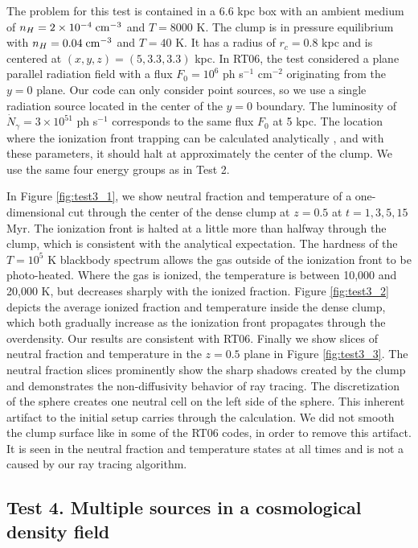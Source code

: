 \documentclass[useAMS,usenatbib]{mn2e}
\begin{document}
The problem for this test is contained in a 6.6 kpc box with an
ambient medium of $n_H = 2 \times 10^{-4}\;\cubecm$ and $T = 8000$ K.
The clump is in pressure equilibrium with $n_H = 0.04\; \cubecm$ and
$T = 40$ K.  It has a radius of $r_c = 0.8$ kpc and is centered at
$(x,y,z) = (5, 3.3, 3.3)$ kpc.  In RT06, the test considered a plane
parallel radiation field with a flux $F_0 = 10^6$ ph s$^{-1}$
cm$^{-2}$ originating from the $y=0$ plane.  Our code can only
consider point sources, so we use a single radiation source located in
the center of the $y=0$ boundary.  The luminosity of $\dot{N}_\gamma =
3 \times 10^{51}$ ph s$^{-1}$ corresponds to the same flux $F_0$ at 5
kpc.  The location where the ionization front trapping can be
calculated analytically \citep{Shapiro04}, and with these parameters,
it should halt at approximately the center of the clump.  We use the
same four energy groups as in Test 2.

In Figure \ref{fig:test3_1}, we show neutral fraction and temperature
of a one-dimensional cut through the center of the dense clump at $z =
0.5$ at $t = 1, 3, 5, 15$ Myr.  The ionization front is halted at a
little more than halfway through the clump, which is consistent with
the analytical expectation.  The hardness of the $T = 10^5$ K
blackbody spectrum allows the gas outside of the ionization front to
be photo-heated.  Where the gas is ionized, the temperature is between
10,000 and 20,000 K, but decreases sharply with the ionized fraction.
Figure \ref{fig:test3_2} depicts the average ionized fraction and
temperature inside the dense clump, which both gradually increase as
the ionization front propagates through the overdensity.  Our results
are consistent with RT06.  Finally we show slices of neutral fraction
and temperature in the $z = 0.5$ plane in Figure \ref{fig:test3_3}.
The neutral fraction slices prominently show the sharp shadows created
by the clump and demonstrates the non-diffusivity behavior of ray
tracing.  The discretization of the sphere creates one neutral cell on
the left side of the sphere.  This inherent artifact to the initial
setup carries through the calculation.  We did not smooth the clump
surface like in some of the RT06 codes, in order to remove this
artifact.  It is seen in the neutral fraction and temperature states
at all times and is not a caused by our ray tracing algorithm.

\subsection{Test 4. Multiple sources in a cosmological density field}
\end{document}
